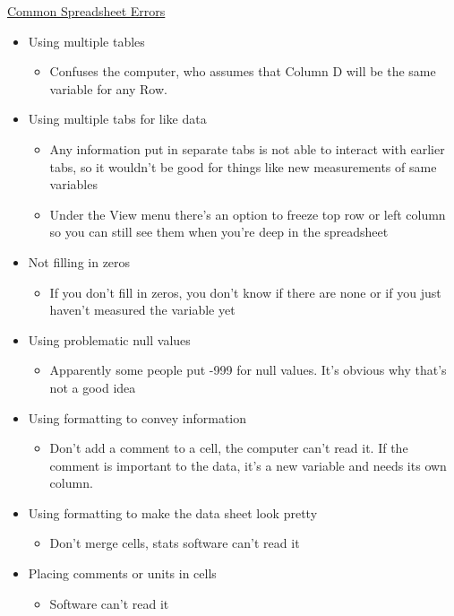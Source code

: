 \documentclass[12pt]{article}
\begin{document}
\underline{Common Spreadsheet Errors}
\begin{itemize}
    \item Using multiple tables
    \begin{itemize}
        \item Confuses the computer, who assumes that Column D will be the same variable for any Row.
    \end{itemize}
    \item Using multiple tabs for like data
    \begin{itemize}
        \item Any information put in separate tabs is not able to interact with earlier tabs, so it wouldn’t be good for things like new measurements of same variables
        \item Under the View menu there’s an option to freeze top row or left column so you can still see them when you’re deep in the spreadsheet
    \end{itemize}
    \item Not filling in zeros
    \begin{itemize}
        \item If you don’t fill in zeros, you don’t know if there are none or if you just haven’t measured the variable yet
    \end{itemize}
    \item Using problematic null values
    \begin{itemize}
        \item Apparently some people put -999 for null values. It’s obvious why that’s not a good idea
    \end{itemize}
    \item Using formatting to convey information
    \begin{itemize}
        \item Don’t add a comment to a cell, the computer can’t read it. If the comment is important to the data, it’s a new variable and needs its own column.
    \end{itemize}
    \item Using formatting to make the data sheet look pretty
    \begin{itemize}
        \item Don’t merge cells, stats software can’t read it
    \end{itemize}
    \item Placing comments or units in cells
    \begin{itemize}
        \item Software can’t read it

\end{itemize}
\end{itemize}
\end{document}
